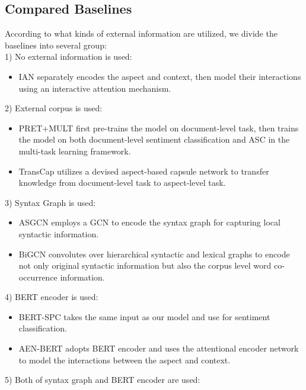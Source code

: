 \subsection{Compared Baselines}
According to what kinds of external information are utilized, we divide the baselines into several group:\\
1) No external information is used:
 \begin{itemize}
 \item IAN \cite{IAN} separately encodes the aspect and context, then model their interactions using an interactive attention mechanism.
\end{itemize}
2) External corpus is used:
 \begin{itemize}
 \item  PRET+MULT \cite{hrd} first pre-trains the model on document-level task, then trains the model on both document-level sentiment classification and ASC in the multi-task learning framework.
 \item TransCap \cite{transcap} utilizes a devised aspect-based capsule network to transfer knowledge from document-level task to aspect-level task.
\end{itemize}
3) Syntax Graph is used: 
 \begin{itemize}
 \item ASGCN \cite{asgcn} employs a GCN to encode the syntax graph for capturing local syntactic information.
 \item BiGCN \cite{bigcn} convolutes over hierarchical syntactic and lexical graphs to encode not only original syntactic information but also the corpus level word co-occurrence information.
\end{itemize}
4) BERT encoder is used: 
 \begin{itemize}
 \item BERT-SPC \cite{bert} takes the same input as our model and use  for sentiment classification.
 \item AEN-BERT \cite{aen-bert} adopts BERT encoder and uses the attentional encoder network to model the interactions between the aspect and context.
\end{itemize}
5) Both of syntax graph and BERT encoder are used: 
